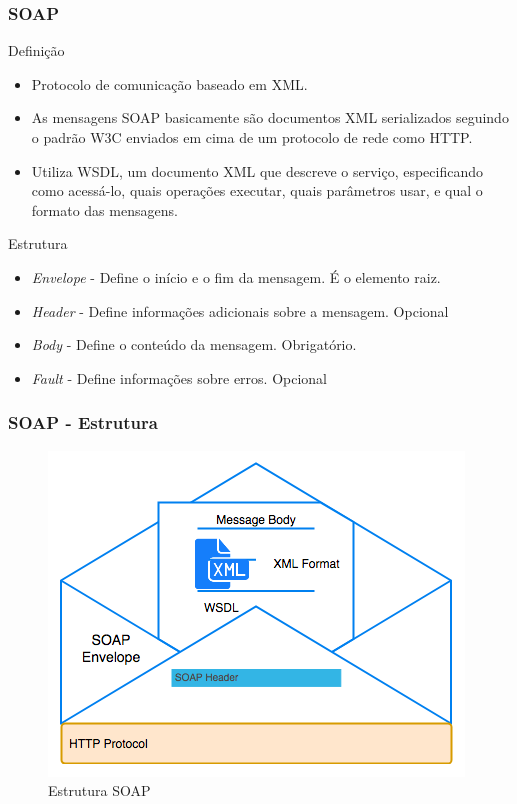 \documentclass[
	10pt, %
	t, %
]{beamer}
\begin{document}
\begin{frame}
	\frametitle{SOAP}
	
	\begin{block}{Definição}
		\begin{itemize}
			\item Protocolo de comunicação baseado em \alert{XML}.
			\item As mensagens SOAP basicamente são \alert{documentos XML} serializados seguindo o padrão W3C enviados em cima de um protocolo de rede como HTTP.
			\item Utiliza \alert{WSDL}, um documento XML que descreve o serviço, especificando como acessá-lo, quais operações executar, quais parâmetros usar, e qual o formato das mensagens.
		\end{itemize}
	\end{block}

	\begin{exampleblock}{Estrutura}
		\begin{itemize}
			\item \textit{Envelope} - Define o início e o fim da mensagem. É o elemento raiz.
			\item \textit{Header} - Define informações adicionais sobre a mensagem. Opcional
			\item \textit{Body} - Define o conteúdo da mensagem. Obrigatório.
			\item \textit{Fault} - Define informações sobre erros. Opcional
		\end{itemize}
	\end{exampleblock}

\end{frame}

\begin{frame}
	\frametitle{SOAP - Estrutura}
	
	\begin{figure}
		\centering
		\includegraphics[width=0.7\linewidth]{soap_structure.png}
		\caption{Estrutura SOAP}
		\label{fig:soap}
	\end{figure}

\end{frame}
\end{document}
